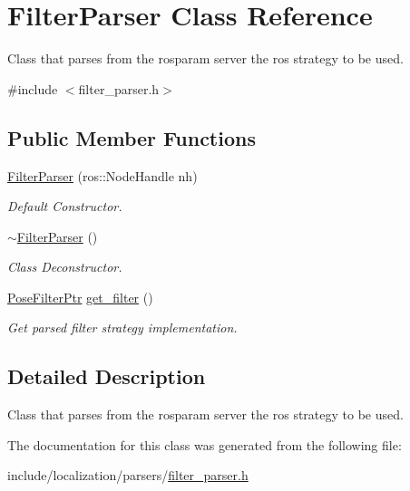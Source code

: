 \hypertarget{classFilterParser}{\section{Filter\-Parser Class Reference}
\label{classFilterParser}
}


Class that parses from the rosparam server the ros strategy to be used.  




{\ttfamily \#include $<$filter\-\_\-parser.\-h$>$}

\subsection*{Public Member Functions}
\begin{DoxyCompactItemize}
\item 
\hypertarget{classFilterParser_a9dacc645f2fb48cdd505e707c712150b}{\hyperlink{classFilterParser_a9dacc645f2fb48cdd505e707c712150b}{Filter\-Parser} (ros\-::\-Node\-Handle nh)}\label{classFilterParser_a9dacc645f2fb48cdd505e707c712150b}

\begin{DoxyCompactList}\small\item\em Default Constructor. \end{DoxyCompactList}\item 
\hypertarget{classFilterParser_a5444670243e803404cd51a9863322ac9}{\hyperlink{classFilterParser_a5444670243e803404cd51a9863322ac9}{$\sim$\-Filter\-Parser} ()}\label{classFilterParser_a5444670243e803404cd51a9863322ac9}

\begin{DoxyCompactList}\small\item\em Class Deconstructor. \end{DoxyCompactList}\item 
\hypertarget{classFilterParser_af815f5bbda50c90b5d741ceec57372a0}{\hyperlink{pose__filter_8h_a9df59d7c2f322f00bdd8eccab6d3fd73}{Pose\-Filter\-Ptr} \hyperlink{classFilterParser_af815f5bbda50c90b5d741ceec57372a0}{get\-\_\-filter} ()}\label{classFilterParser_af815f5bbda50c90b5d741ceec57372a0}

\begin{DoxyCompactList}\small\item\em Get parsed filter strategy implementation. \end{DoxyCompactList}\end{DoxyCompactItemize}


\subsection{Detailed Description}
Class that parses from the rosparam server the ros strategy to be used. 

The documentation for this class was generated from the following file\-:\begin{DoxyCompactItemize}
\item 
include/localization/parsers/\hyperlink{filter__parser_8h}{filter\-\_\-parser.\-h}\end{DoxyCompactItemize}
